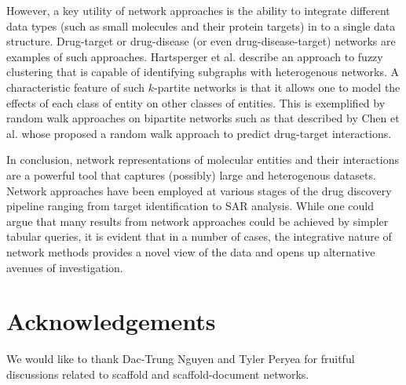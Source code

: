 \documentclass[]{book}
\begin{document}
However, a key utility of network approaches is the ability to
integrate different data types (such as small molecules and their
protein targets) in to a single data structure. Drug-target or
drug-disease (or even drug-disease-target) networks are examples of
such approaches. Hartsperger et al. \cite{Hartsperger:2010yg} describe
an approach to fuzzy clustering that is capable of identifying
subgraphs with heterogenous networks. A characteristic feature of such
$k$-partite networks is that it allows one to model the effects of
each class of entity on other classes of entities. This is exemplified
by random walk approaches on bipartite networks such as that described
by Chen et al. \cite{Chen:2012qy} whose proposed a random walk approach
to predict drug-target interactions.

In conclusion, network representations of molecular entities and their
interactions are a powerful tool that captures (possibly) large and
heterogenous datasets. Network approaches have been employed at
various stages of the drug discovery pipeline ranging from target
identification to SAR analysis. While one could argue that many
results from network approaches could be achieved by simpler tabular
queries, it is evident that in a number of cases, the integrative
nature of network methods provides a novel view of the data and opens
up alternative avenues of investigation.

\section{Acknowledgements}
\label{sec:acknowledgements}

We would like to thank Dac-Trung Nguyen and Tyler Peryea for fruitful
discussions related to scaffold and scaffold-document networks.


\end{document}
